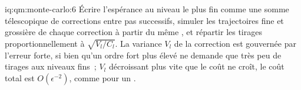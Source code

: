 \begin{solution}{iq:qm:monte-carlo:6}
Écrire l'espérance au niveau le plus fin comme une somme télescopique de corrections entre pas successifs, simuler les trajectoires fine et grossière de chaque correction à partir du même , et répartir
les tirages proportionnellement à $\sqrt{V_l/C_l}$. La variance $V_l$ de la correction est gouvernée par l'erreur forte, si bien qu'un ordre fort plus élevé ne demande que très peu de tirages aux niveaux fins~; $V_l$ décroissant
plus vite que le coût ne croît, le coût total est $O(\epsilon^{-2})$, comme pour un .
\end{solution}
